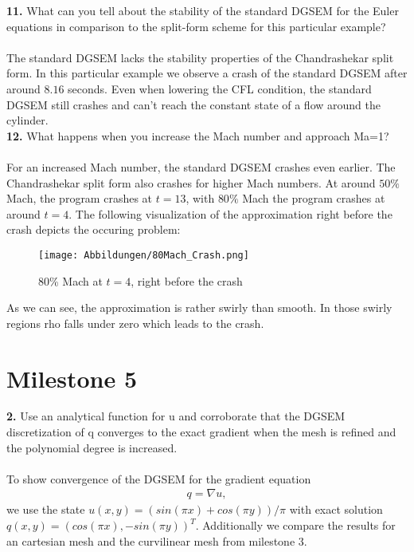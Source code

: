 \documentclass[11pt]{scrartcl}
\begin{document}
\textbf{11.} What can you tell about the stability of the standard DGSEM for the Euler equations in comparison to the split-form scheme for this particular example?\\ \ \\
The standard DGSEM lacks the stability properties of the Chandrashekar split form. In this particular example we observe a crash of the standard DGSEM after around $8.16$ seconds. Even when lowering the CFL condition, the standard DGSEM still crashes and can't reach the constant state of a flow around the cylinder.\\

\textbf{12.} What happens when you increase the Mach number and approach Ma=1? \\ \ \\

For an increased Mach number, the standard DGSEM crashes even earlier. The Chandrashekar split form also crashes for higher Mach numbers. At around $50\%$ Mach, the program crashes at $t = 13$, with $80\%$ Mach the program crashes at around $t=4$. The following visualization of the approximation right before the crash depicts the occuring problem: \\
\begin{figure}[H]
\texttt{[image: Abbildungen/80Mach\_Crash.png]}
\caption{80\% Mach at $t=4$, right before the crash}
\end{figure}
As we can see, the approximation is rather swirly than smooth. In those swirly regions rho falls under zero which leads to the crash.


\newpage
\section{Milestone 5}

\textbf{2.} Use an analytical function for u and corroborate that the DGSEM
discretization of q converges to the exact gradient when the mesh is
refined and the polynomial degree is increased.\\
\\
To show convergence of the DGSEM for the gradient equation
\begin{align*}
q = \nabla u,
\end{align*}
we use the state $u(x, y)=(sin(\pi x) + cos(\pi y))/\pi$ with exact solution $q(x, y) = (cos(\pi x), -sin(\pi y))^T$. Additionally we compare the results for an cartesian mesh and the curvilinear mesh from milestone $3$.
\end{document}
